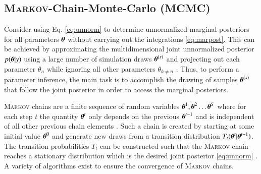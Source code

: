 \subsection{\textsc{Markov}-Chain-Monte-Carlo (MCMC)}
Consider using Eq. \eqref{eq:unnorm} to determine unnormalized marginal posteriors for all parameters $\boldsymbol{\theta}$ without carrying out the integrations \eqref{eq:marpost}. This can be achieved by approximating the multidimensional joint unnormalized posterior $p(\boldsymbol{\theta}|y)$ using a large number of simulation draws $\boldsymbol{\theta}^{(s)}$ and projecting out each parameter $\theta_n$ while ignoring all other parameters $\theta_{k\neq n}$ \cite{Trotta_2008}. Thus, to perform a parameter inference, the main task is to accomplish the drawing of samples $\boldsymbol{\theta}^{(s)}$ that follow the joint posterior in order to access the marginal posteriors.

\textsc{Markov} chains are a finite sequence of  random variables $\boldsymbol{\theta}^{1},\boldsymbol{\theta}^{2}\dots\boldsymbol{\theta}^S$ where for each step $t$ the quantity $\boldsymbol{\theta}^t$ only depends on the previous $\boldsymbol{\theta}^{t-1}$ and is independent  of all other previous chain elements \cite{bayes}. Such a chain is created by starting at some initial value $\boldsymbol{\theta}^0$ and generate new draws from a transition distribution $T_t(\boldsymbol{\theta}^t|\boldsymbol{\theta}^{t-1})$. The transition probabilities $T_t$ can be constructed such that the \textsc{Markov} chain reaches a stationary distribution which is the desired joint posterior \eqref{eq:unnorm} \cite{bayes,norris_1997}. A variety of algorithms exist to ensure the convergence of \textsc{Markov} chains. 
